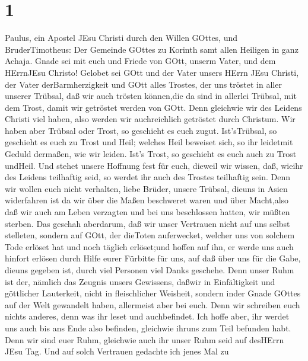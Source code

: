 \hypertarget{section}{%
\section{1}\label{section}}

 Paulus, ein Apostel JEsu Christi durch den Willen GOttes,
und BruderTimotheus: Der Gemeinde GOttes zu Korinth samt allen Heiligen
in ganz Achaja.  Gnade sei mit euch und Friede von GOtt,
unserm Vater, und dem HErrnJEsu Christo!  Gelobet sei GOtt
und der Vater unsers HErrn JEsu Christi, der Vater derBarmherzigkeit und
GOtt alles Trostes,  der uns tröstet in aller unserer
Trübsal, daß wir auch trösten können,die da sind in allerlei Trübsal,
mit dem Trost, damit wir getröstet werden von GOtt.  Denn
gleichwie wir des Leidens Christi viel haben, also werden wir
auchreichlich getröstet durch Christum.  Wir haben aber
Trübsal oder Trost, so geschieht es euch zugut. Ist'sTrübsal, so
geschieht es euch zu Trost und Heil; welches Heil beweiset sich, so ihr
leidetmit Geduld dermaßen, wie wir leiden. Ist's Trost, so geschieht es
euch auch zu Trost undHeil.  Und stehet unsere Hoffnung fest
für euch, dieweil wir wissen, daß, wieihr des Leidens teilhaftig seid,
so werdet ihr auch des Trostes teilhaftig sein.  Denn wir
wollen euch nicht verhalten, liebe Brüder, unsere Trübsal, dieuns in
Asien widerfahren ist da wir über die Maßen beschweret waren und über
Macht,also daß wir auch am Leben verzagten  und bei uns
beschlossen hatten, wir müßten sterben. Das geschah aberdarum, daß wir
unser Vertrauen nicht auf uns selbst stelleten, sondern auf GOtt, der
dieToten auferwecket,  welcher uns von solchem Tode erlöset
hat und noch täglich erlöset;und hoffen auf ihn, er werde uns auch
hinfort erlösen  durch Hilfe eurer Fürbitte für uns, auf
daß über uns für die Gabe, dieuns gegeben ist, durch viel Personen viel
Danks geschehe.  Denn unser Ruhm ist der, nämlich das
Zeugnis unsers Gewissens, daßwir in Einfältigkeit und göttlicher
Lauterkeit, nicht in fleischlicher Weisheit, sondern inder Gnade GOttes
auf der Welt gewandelt haben, allermeist aber bei euch. 
Denn wir schreiben euch nichts anderes, denn was ihr leset und
auchbefindet. Ich hoffe aber, ihr werdet uns auch bis ans Ende also
befinden, gleichwie ihruns zum Teil befunden habt.  Denn
wir sind euer Ruhm, gleichwie auch ihr unser Ruhm seid auf desHErrn JEsu
Tag.  Und auf solch Vertrauen gedachte ich jenes Mal zu
